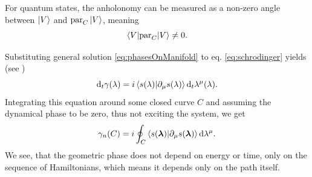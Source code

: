For quantum states, the anholonomy can be measured as a non-zero angle between $\ket{V}$ and $\textrm{par}_C\ket{V}$, meaning
$$\braket{V|\textrm{par}_C|V}\neq 0.$$ 


Substituting general solution \ref{eq:phasesOnManifold} to eq. \ref{eq:schrodinger} yields (see \citep{berry1984})
\begin{equation}
    \mathrm{d}_t \gamma(\lambda)=i\braket{s(\lambda)|\partial_\mu s(\lambda)} \mathrm{d}_t \lambda^\mu(\lambda).
\end{equation}
Integrating this equation around some closed curve $C$ and assuming the dynamical phase to be zero, thus not exciting the system, we get
\begin{equation}
    \gamma_n(C)=i\oint_C\braket{s({\bm\lambda})|\partial_\mu s({\bm\lambda})}\mathrm{d} \lambda^\mu.
    \label{eq:gammaCoint}
\end{equation}
We see, that the geometric phase does not depend on energy or time, only on the sequence of Hamiltonians, which means it depends only on the path itself.




